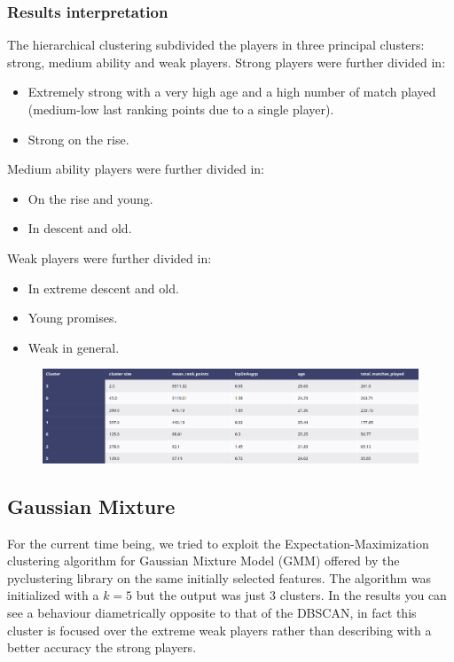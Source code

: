 \subsubsection{Results interpretation}
The hierarchical clustering subdivided the players in three principal clusters: strong, medium ability and weak players. Strong players were further divided in:
\begin{itemize}
    \item Extremely strong with a very high age and a high number of match played (medium-low last ranking points due to a single player).
    \item Strong on the rise. 
\end{itemize}
Medium ability players were further divided in:
\begin{itemize}
    \item On the rise and young.
    \item In descent and old. 
\end{itemize}
Weak players were further divided in:
\begin{itemize}
    \item In extreme descent and old.
    \item Young promises.
    \item Weak in general.
\end{itemize}
	
\begin{figure}[h]
\centering
\includegraphics[width=.6\textwidth]{plots/hierarchical/hierarchical_results}
\label{fig:hierarchical_results}
\end{figure}

\subsection{Gaussian Mixture}
For the current time being, we tried to exploit the Expectation-Maximization clustering algorithm for Gaussian Mixture Model (GMM) offered by the pyclustering library on the same initially selected features. The algorithm was initialized with a $k=5$ but the output was just $3$ clusters. In the results you can see a behaviour diametrically opposite to that of the DBSCAN, in fact this cluster is focused over the extreme weak players rather than describing with a better accuracy the strong players.  

